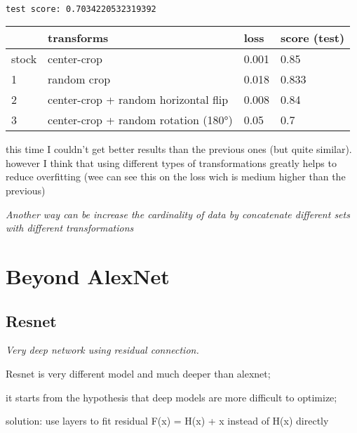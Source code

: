 \documentclass[11pt]{article}
\begin{document}
    \begin{center}
    \end{center}
    { \hspace*{\fill} \\}
    
    \begin{Verbatim}[commandchars=\\\{\}]
 test score: 0.7034220532319392
 \end{Verbatim}

    \begin{longtable}[]{@{}llll@{}}
\toprule
& transforms & loss & score (test)\tabularnewline
\midrule
\endhead
stock & center-crop & 0.001 & 0.85\tabularnewline
1 & random crop & 0.018 & 0.833\tabularnewline
2 & center-crop + random horizontal flip & 0.008 & 0.84\tabularnewline
3 & center-crop + random rotation (180°) & 0.05 & 0.7\tabularnewline
\bottomrule
\end{longtable}

this time I couldn't get better results than the previous ones (but
quite similar). however I think that using different types of
transformations greatly helps to reduce overfitting (wee can see this on
the loss wich is medium higher than the previous)

\emph{Another way can be increase the cardinality of data by concatenate
different sets with different transformations}

    \hypertarget{beyond-alexnet}{%
\section{\texorpdfstring{\textbf{Beyond
AlexNet}}{Beyond AlexNet}}\label{beyond-alexnet}}

\hypertarget{resnet}{%
\subsection{\texorpdfstring{\textbf{Resnet}}{Resnet}}\label{resnet}}

\emph{Very deep network using residual connection.}

Resnet is very different model and much deeper than alexnet;

it starts from the hypothesis that deep models are more difficult to
optimize;

solution: use layers to fit residual F(x) = H(x) + x instead of H(x)
directly
\end{document}
